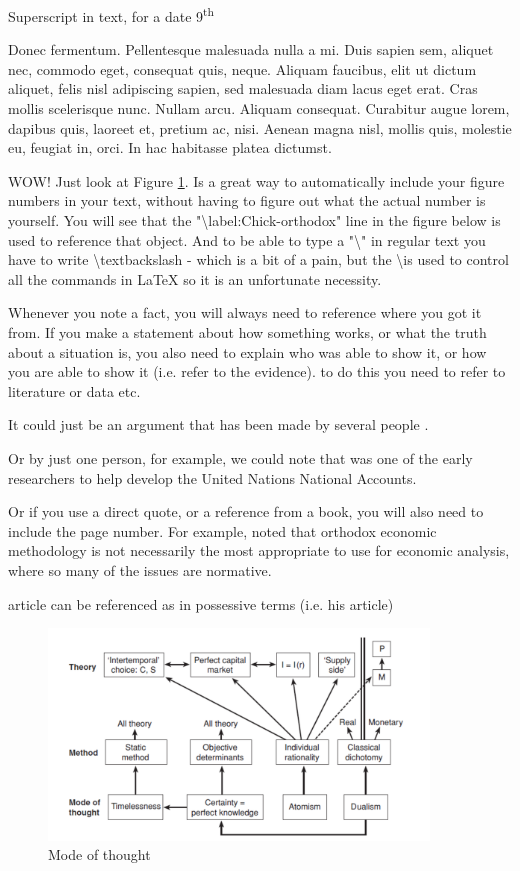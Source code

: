 \documentclass[english,a4paper,12pt]{article}
\makeatletter
\DeclareRobustCommand\citepos
  {\begingroup
   \let\NAT@nmfmt\NAT@posfmt%
   \NAT@swafalse\let\NAT@ctype\z@\NAT@partrue
   \@ifstar{\NAT@fulltrue\NAT@citetp}{\NAT@fullfalse\NAT@citetp}}
\let\NAT@orig@nmfmt\NAT@nmfmt
\def\NAT@posfmt#1{\NAT@orig@nmfmt{#1's}}
\makeatother
\begin{document}
Superscript in text, for a date 9\textsuperscript{th}

Donec fermentum. Pellentesque malesuada nulla a mi. Duis sapien sem, aliquet nec, commodo eget, consequat quis, neque. Aliquam faucibus, elit ut dictum aliquet, felis nisl adipiscing sapien, sed malesuada diam lacus eget erat. Cras mollis scelerisque nunc. Nullam arcu. Aliquam consequat. Curabitur augue lorem, dapibus quis, laoreet et, pretium ac, nisi. Aenean magna nisl, mollis quis, molestie eu, feugiat in, orci. In hac habitasse platea dictumst.

WOW! Just look at Figure \ref{fig:Chick-orthodox}. Is a great way to automatically include your figure numbers in your text, without having to figure out what the actual number is yourself. You will see that the "\textbackslash label:Chick-orthodox" line in the figure below is used to reference that object. And to be able to type a "\textbackslash " in regular text you have to write \textbackslash textbackslash - which is a bit of a pain, but the \textbackslash is used to control all the commands in LaTeX so it is an unfortunate necessity.

Whenever you note a fact, you will always need to reference where you got it from. If you make a statement about how something works, or what the truth about a situation is, you also need to explain who was able to show it, or how you are able to show it (i.e. refer to the evidence). to do this you need to refer to literature or data etc.

It could just be an argument that has been made by several people \citep{bell2001role,wray2006}.

Or by just one person, for example, we could note that \citet{stone1966} was one of the early researchers to help develop the United Nations National Accounts.

Or if you use a direct quote, or a reference from a book, you will also need to include the page number. For example, \citet[p.~150]{chickdow2002} noted that orthodox economic methodology is not necessarily the most appropriate to use for economic analysis, where so many of the issues are normative.

\citepos{zezza2004circuit} article can be referenced as in possessive terms (i.e. his article)

\begin{figure}
    \centering
    \includegraphics[width=0.9\textwidth]{images/chick2003modeofthought.pdf}
    \caption{Mode of thought}
    \label{fig:Chick-orthodox}
\end{figure}
\end{document}
